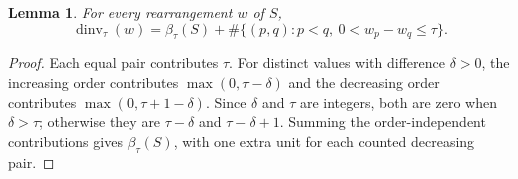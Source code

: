 \documentclass[11pt]{article}
\newtheorem{lemma}[theorem]{Lemma}
\theoremstyle{remark}
\DeclareMathOperator{\dinv}{dinv}
\numberwithin{equation}{section}
\begin{document}
\begin{lemma}\label{lem:dyck-statistic}
For every rearrangement $w$ of $S$,
\begin{equation}\label{eq:static-statistic}
 \dinv_\tau(w)=\beta_\tau(S)
       +\#\{(p,q):p<q,\ 0<w_p-w_q\leq\tau\}.
\end{equation}
\end{lemma}
\begin{proof}
Each equal pair contributes $\tau$. For distinct values with difference
$\delta>0$, the increasing order contributes $\max(0,\tau-\delta)$
and the decreasing order contributes $\max(0,\tau+1-\delta)$.
Since $\delta$ and $\tau$ are integers, both are zero when
$\delta>\tau$; otherwise they are $\tau-\delta$ and
$\tau-\delta+1$. Summing the order-independent contributions gives
$\beta_\tau(S)$, with one extra unit for each counted decreasing pair.
\end{proof}
\end{document}
